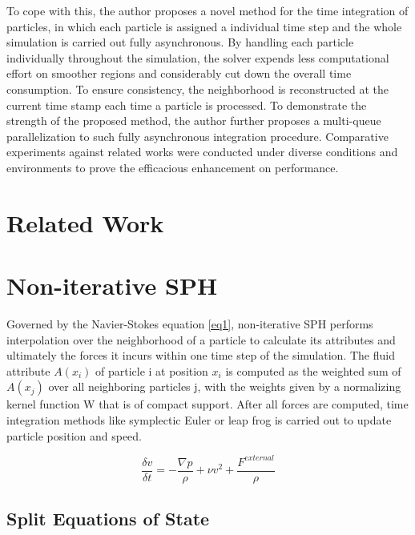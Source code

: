 \documentclass[
	11pt, 
	DIV10,
	ngerman,
	a4paper, 
	oneside, 
	headings=normal, 
	captions=tableheading,
	final, 
	numbers=noenddot
]{scrartcl}
\begin{document}
\par
To cope with this, the author proposes a novel method for the time integration of particles, in which each particle is assigned a individual time step and the whole simulation is carried out fully asynchronous. By handling each particle
individually throughout the simulation, the solver expends less computational effort on smoother regions and considerably cut down the overall time consumption. To ensure consistency, the neighborhood is reconstructed at the current time stamp each time a particle is processed. To demonstrate the strength of the proposed method, the author further proposes a multi-queue parallelization to such fully asynchronous integration procedure. Comparative experiments against related works were conducted under diverse conditions and environments to prove the efficacious enhancement on performance.

\section{Related Work}

\section{Non-iterative SPH}

Governed by the Navier-Stokes equation \ref{eq1}, non-iterative SPH performs interpolation over the neighborhood of a particle to calculate its attributes and ultimately the forces it incurs within one time step of the simulation. The fluid attribute $ A(x_{i}) $ of particle i at position $ x_{i} $ is computed as the weighted sum of  $ A(x_{j}) $ over all neighboring particles j, with the weights given by a normalizing kernel function W that is of compact support. After all forces are computed, time integration methods like symplectic Euler or leap frog is carried out to update particle position and speed.

\begin{equation}
	\label{eq1}
	\frac{\delta v}{\delta t} = -\frac{\nabla p}{\rho} + \nu v^{2} + \frac{F^{external}}{\rho}
\end{equation}

\subsection{Split Equations of State}
\end{document}
